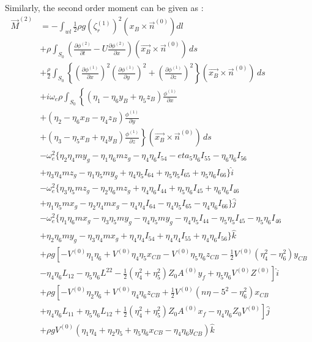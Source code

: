 Similarly, the second order moment can be given as :
\begin{align}
    \vec{M}^{(2)} &= -\int_{wl}\frac{1}{2}\rho g (\zeta_r^{(1)})^2 (x_B\times \vec{n}^{(0)}) dl \\ \nonumber
    &+\rho\int_{S_0}\left(\frac{\partial \phi^{(2)}}{\partial t} - U\frac{\partial \phi^{(2)}}{\partial x}\right)
    (\vec{x_B}\times\vec{n}^{(0)})\,ds \\ \nonumber
    &+\frac{\rho}{2}\int_{S_0}\left\{\left(\frac{\partial \phi^{(1)}}{\partial x}\right)^2
    \left(\frac{\partial \phi^{(1)}}{\partial y}\right)^2 + \left(\frac{\partial \phi^{(1)}}{\partial z}\right)^2
    \right\}(\vec{x_B}\times\vec{n}^{(0)})\,ds \\ \nonumber
    &+i\omega_e\rho\int_{S_0}
    \left\{(\eta_1-\eta_6y_B+\eta_5z_B)\frac{\phi^{(1)}}{\partial x} \right. \\ \nonumber 
    &\left. + (\eta_2-\eta_6x_B-\eta_4z_B)\frac{\phi^{(1)}}{\partial y}\right. \\ \nonumber
    &\left. + (\eta_3-\eta_5x_B+\eta_4y_B)\frac{\phi^{(1)}}{\partial z}\right\}
    (\vec{x_B}\times \vec{n}^{(0)})\,ds \\ \nonumber
    &-\omega_e^2\{\eta_2\eta_4my_g-\eta_1\eta_6mz_g-\eta_4\eta_6I_{54}
    -eta_5\eta_6I_{55}-\eta_6\eta_6I_{56} \\ \nonumber
    &+\eta_3\eta_4mz_g-\eta_1\eta_5my_g+\eta_4\eta_5I_{64}+\eta_5\eta_5 I_{65}
    +\eta_5\eta_6 I_{66} \}\hat{i} \\ \nonumber
    &-\omega_e^2\{\eta_3\eta_5mz_g-\eta_2\eta_6mz_g+\eta_4\eta_6I_{44}+\eta_5\eta_6 I_{45}
    +\eta_6\eta_6I_{46}\\ \nonumber
    &+\eta_1\eta_5mx_g-\eta_2\eta_4mx_g-\eta_4\eta_4 I_{64}-\eta_4\eta_5 I_{65}-\eta_4\eta_6 I_{66}\} \hat{j} \\ \nonumber
    &-\omega_e^2\{\eta_1\eta_6mx_g-\eta_3\eta_5my_g-\eta_4\eta_5my_g-\eta_4\eta_5 I_{44}
    -\eta_5\eta_5 I_{45}-\eta_5\eta_6 I_{46} \\ \nonumber
    &+\eta_2\eta_6my_g-\eta_3\eta_4mx_g+\eta_4\eta_4 I_{54}+\eta_4\eta_4 I_{55}
    +\eta_4\eta_6 I_{56} \}\hat{k} \\ \nonumber
    &+\rho g \left[-V^{(0)}\eta_1\eta_6+V^{(0)}\eta_4\eta_5x_{CB}-V^{(0)}\eta_5\eta_6z_{CB}
    -\frac{1}{2}V^{(0)}(\eta_4^2-\eta_6^2)y_{CB} \right. \\ \nonumber
    &\left.-\eta_4\eta_6L_{12} -\eta_5\eta_6L^{22}-\frac{1}{2}(\eta_4^2+\eta_5^2)
    Z_0A^{(0)}y_f+\eta_5\eta_6V^{(0)}Z^{(0)}\right]\hat{i} \\ \nonumber
    &+\rho g \left[-V^{(0)}\eta_2\eta_6+V^{(0)}\eta_4\eta_6 z_{CB}+\frac{1}{2}V^{(0)} 
    (n\eta-5^2-\eta_6^2)x_{CB} \right. \\ \nonumber
    &\left. +\eta_4\eta_6 L_{11}+\eta_5\eta_6L_{12}+\frac{1}{2}(\eta_4^2+\eta_5^2)Z_0A^{(0)}x_f
    -\eta_4\eta_6 Z_0V^{(0)}\right]\hat{j} \\ \nonumber
    &+\rho g V^{(0)}(\eta_1\eta_4+\eta_2\eta_5+\eta_5\eta_6x_{CB}-\eta_4\eta_6y_{CB})\hat{k}
\end{align}

